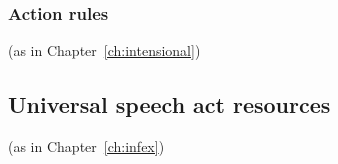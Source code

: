 \subsubsection{Action rules} (as in Chapter~\ref{ch:intensional})


  






  


  


    


    
  





\subsection{Universal speech act resources} (as in Chapter~\ref{ch:infex})

